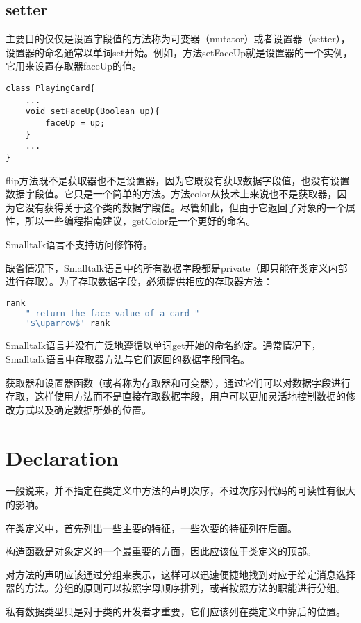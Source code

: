 \subsection{setter}


主要目的仅仅是设置字段值的方法称为可变器（mutator）或者设置器（setter），设置器的命名通常以单词set开始。例如，方法setFaceUp就是设置器的一个实例，它用来设置存取器faceUp的值。


\begin{lstlisting}[language={[Sharp]C}]
class PlayingCard{
	...
	void setFaceUp(Boolean up){
		faceUp = up;
	}
	...
}
\end{lstlisting}

flip方法既不是获取器也不是设置器，因为它既没有获取数据字段值，也没有设置数据字段值。它只是一个简单的方法。方法color从技术上来说也不是获取器，因为它没有获得关于这个类的数据字段值。尽管如此，但由于它返回了对象的一个属性，所以一些编程指南建议，getColor是一个更好的命名。


Smalltalk语言不支持访问修饰符。

缺省情况下，Smalltalk语言中的所有数据字段都是private（即只能在类定义内部进行存取）。为了存取数据字段，必须提供相应的存取器方法：


\begin{lstlisting}[language=bash]
rank 
	" return the face value of a card "
	'$\uparrow$' rank
\end{lstlisting}



Smalltalk语言并没有广泛地遵循以单词get开始的命名约定。通常情况下，Smalltalk语言中存取器方法与它们返回的数据字段同名。

获取器和设置器函数（或者称为存取器和可变器），通过它们可以对数据字段进行存取，这样使用方法而不是直接存取数据字段，用户可以更加灵活地控制数据的修改方式以及确定数据所处的位置。


\section{Declaration}


一般说来，并不指定在类定义中方法的声明次序，不过次序对代码的可读性有很大的影响。

\begin{compactitem}
\item 在类定义中，首先列出一些主要的特征，一些次要的特征列在后面。
\item 构造函数是对象定义的一个最重要的方面，因此应该位于类定义的顶部。
\item 对方法的声明应该通过分组来表示，这样可以迅速便捷地找到对应于给定消息选择器的方法。分组的原则可以按照字母顺序排列，或者按照方法的职能进行分组。
\item 私有数据类型只是对于类的开发者才重要，它们应该列在类定义中靠后的位置。
\end{compactitem}


